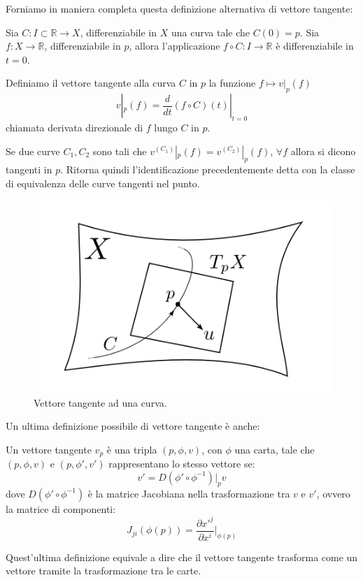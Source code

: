 Forniamo in maniera completa questa definizione alternativa di vettore tangente:
\begin{definizione}
Sia $C:I\subset \mathbb{R} \rightarrow X$, differenziabile in $X$ una curva tale che $C(0)=p$. Sia $f : X \rightarrow \mathbb{R}$, differenziabile in $p$, allora l'applicazione $f \circ C : I \rightarrow \mathbb{R}$ è differenziabile in $t=0$.

Definiamo il vettore tangente alla curva $C$ in $p$ la funzione $f \mapsto v|_p(f)$
\begin{equation*}
    v|_p(f) = \frac{d}{dt}(f\circ C)(t)|_{t=0}
\end{equation*}
chiamata derivata direzionale di $f$ lungo $C$ in $p$.
\end{definizione}
Se due curve $C_1, C_2$ sono tali che $v^{(C_1)}|_p(f) = v^{(C_2)}|_p(f)$, $\forall f$ allora si dicono tangenti in $p$. Ritorna quindi l'identificazione precedentemente detta con la classe di equivalenza delle curve tangenti nel punto.
\begin{figure}
    \centering
    \includegraphics[scale=0.5]{immagini/vettangente.png}
    \caption{Vettore tangente ad una curva.}
    \label{fig.vett_tangente_curva}
\end{figure}

Un ultima definizione possibile di vettore tangente è anche:
\begin{definizione}
Un vettore tangente $v_p$ è una tripla $(p,\phi,v)$, con $\phi$ una carta, tale che $(p,\phi,v)$ e $(p,\phi', v')$ rappresentano lo stesso vettore se:
\begin{equation*}
    v' = D(\phi' \circ \phi^{-1})|_p v
\end{equation*}
dove $D(\phi' \circ \phi^{-1})$ è la matrice Jacobiana nella trasformazione tra $v$ e $v'$, ovvero la matrice di componenti:
\begin{equation*}
    J_{ji}(\phi(p)) = \frac{\partial x'^j}{\partial x^i}\Big|_{\phi(p)}
\end{equation*}
\end{definizione}
Quest'ultima definizione equivale a dire che il vettore tangente trasforma come un vettore tramite la trasformazione tra le carte.

